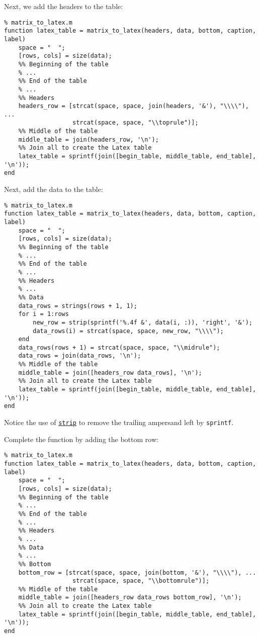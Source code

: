 \documentclass[12pt, a4paper]{article}
\begin{document}
Next, we add the headers to the table:
\lstset{language=matlab,label= ,caption= ,captionpos=b,firstnumber=1,numbers=left,style=Matlab-editor}
\begin{lstlisting}
% matrix_to_latex.m
function latex_table = matrix_to_latex(headers, data, bottom, caption, label)
    space = "  ";
    [rows, cols] = size(data);
    %% Beginning of the table
    % ...
    %% End of the table
    % ...
    %% Headers
    headers_row = [strcat(space, space, join(headers, '&'), "\\\\"), ...
                   strcat(space, space, "\\toprule")];
    %% Middle of the table
    middle_table = join(headers_row, '\n');
    %% Join all to create the Latex table
    latex_table = sprintf(join([begin_table, middle_table, end_table], '\n'));
end
\end{lstlisting}

Next, add the data to the table:
\lstset{language=matlab,label= ,caption= ,captionpos=b,firstnumber=1,numbers=left,style=Matlab-editor}
\begin{lstlisting}
% matrix_to_latex.m
function latex_table = matrix_to_latex(headers, data, bottom, caption, label)
    space = "  ";
    [rows, cols] = size(data);
    %% Beginning of the table
    % ...
    %% End of the table
    % ...
    %% Headers
    % ...
    %% Data
    data_rows = strings(rows + 1, 1);
    for i = 1:rows
        new_row = strip(sprintf('%.4f &', data(i, :)), 'right', '&');
        data_rows(i) = strcat(space, space, new_row, "\\\\");
    end
    data_rows(rows + 1) = strcat(space, space, "\\midrule");
    data_rows = join(data_rows, '\n');
    %% Middle of the table
    middle_table = join([headers_row data_rows], '\n');
    %% Join all to create the Latex table
    latex_table = sprintf(join([begin_table, middle_table, end_table], '\n'));
end
\end{lstlisting}
Notice the use of \href{https://www.mathworks.com/help/matlab/ref/strip.html}{\texttt{strip}} to remove the trailing ampersand left by \texttt{sprintf}.

Complete the function by adding the bottom row:
\lstset{language=matlab,label= ,caption= ,captionpos=b,firstnumber=1,numbers=left,style=Matlab-editor}
\begin{lstlisting}
% matrix_to_latex.m
function latex_table = matrix_to_latex(headers, data, bottom, caption, label)
    space = "  ";
    [rows, cols] = size(data);
    %% Beginning of the table
    % ...
    %% End of the table
    % ...
    %% Headers
    % ...
    %% Data
    % ...
    %% Bottom
    bottom_row = [strcat(space, space, join(bottom, '&'), "\\\\"), ...
                   strcat(space, space, "\\bottomrule")];
    %% Middle of the table
    middle_table = join([headers_row data_rows bottom_row], '\n');
    %% Join all to create the Latex table
    latex_table = sprintf(join([begin_table, middle_table, end_table], '\n'));
end
\end{lstlisting}
\end{document}
